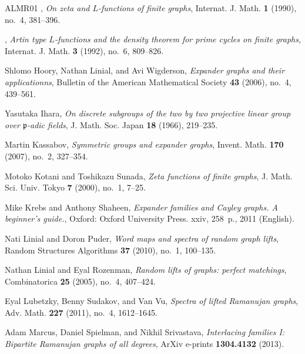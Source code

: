 \documentclass{memo-l}
\theoremstyle{plain}
\theoremstyle{definition}
\numberwithin{section}{chapter}
\numberwithin{equation}{chapter}
\theoremstyle{plain}
\theoremstyle{definition}
\begin{document}
\begin{thebibliography}{ALMR01}
\bysame, \emph{On zeta and {$L$}-functions of finite graphs}, Internat. J.
  Math. \textbf{1} (1990), no.~4, 381--396. 

\bysame, \emph{Artin type {$L$}-functions and the density theorem for prime
  cycles on finite graphs}, Internat. J. Math. \textbf{3} (1992), no.~6,
  809--826. 

Shlomo Hoory, Nathan Linial, and Avi Wigderson, \emph{Expander graphs and their
  applicationns}, Bulletin of the American Mathematical Society \textbf{43}
  (2006), no.~4, 439--561.

Yasutaka Ihara, \emph{On discrete subgroups of the two by two projective linear
  group over {${\mathfrak p}$}-adic fields}, J. Math. Soc. Japan \textbf{18}
  (1966), 219--235. 

Martin Kassabov, \emph{Symmetric groups and expander graphs}, Invent. Math.
  \textbf{170} (2007), no.~2, 327--354. 

Motoko Kotani and Toshikazu Sunada, \emph{Zeta functions of finite graphs}, J.
  Math. Sci. Univ. Tokyo \textbf{7} (2000), no.~1, 7--25. 

Mike Krebs and Anthony Shaheen, \emph{{Expander families and Cayley graphs. A
  beginner's guide.}}, {Oxford: Oxford University Press. xxiv, 258~p.}, 2011
  (English).

Nati Linial and Doron Puder, \emph{Word maps and spectra of random graph
  lifts}, Random Structures Algorithms \textbf{37} (2010), no.~1, 100--135.

Nathan Linial and Eyal Rozenman, \emph{Random lifts of graphs: perfect
  matchings}, Combinatorica \textbf{25} (2005), no.~4, 407--424. 

Eyal Lubetzky, Benny Sudakov, and Van Vu, \emph{Spectra of lifted {R}amanujan
  graphs}, Adv. Math. \textbf{227} (2011), no.~4, 1612--1645. 

Adam Marcus, Daniel Spielman, and Nikhil Srivastava, \emph{Interlacing families
  {I}: Bipartite {Ramanujan} graphs of all degrees}, ArXiv e-prints
  \textbf{1304.4132} (2013).


\end{thebibliography}
\end{document}
